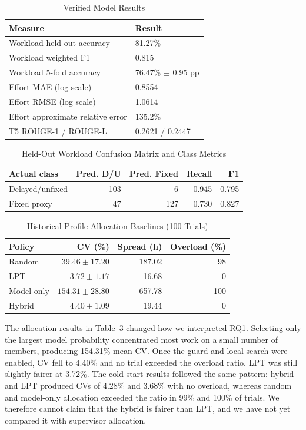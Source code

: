 \documentclass[conference]{IEEEtran}
\begin{document}
\begin{table}[t]
\caption{Verified Model Results}
\label{tab:results}
\centering
\footnotesize
\begin{tabular}{|p{3.65cm}|p{3.45cm}|}
\hline
Measure & Result \\ \hline
Workload held-out accuracy & 81.27\% \\ \hline
Workload weighted F1 & 0.815 \\ \hline
Workload 5-fold accuracy & 76.47\% $\pm$ 0.95 pp \\ \hline
Effort MAE (log scale) & 0.8554 \\ \hline
Effort RMSE (log scale) & 1.0614 \\ \hline
Effort approximate relative error & 135.2\% \\ \hline
T5 ROUGE-1 / ROUGE-L & 0.2621 / 0.2447 \\ \hline
\end{tabular}
\end{table}

\begin{table}[t]
\caption{Held-Out Workload Confusion Matrix and Class Metrics}
\label{tab:confusion}
\centering
\footnotesize
\begin{tabular}{|l|r|r|r|r|}
\hline
Actual class & Pred. D/U & Pred. Fixed & Recall & F1 \\ \hline
Delayed/unfixed & 103 & 6 & 0.945 & 0.795 \\ \hline
Fixed proxy & 47 & 127 & 0.730 & 0.827 \\ \hline
\end{tabular}
\end{table}

\begin{table}[t]
\caption{Historical-Profile Allocation Baselines (100 Trials)}
\label{tab:allocation}
\centering
\footnotesize
\begin{tabular}{|l|r|r|r|}
\hline
Policy & CV (\%) & Spread (h) & Overload (\%) \\ \hline
Random & $39.46\pm17.20$ & 187.02 & 98 \\ \hline
LPT & $3.72\pm1.17$ & 16.68 & 0 \\ \hline
Model only & $154.31\pm28.80$ & 657.78 & 100 \\ \hline
Hybrid & $4.40\pm1.09$ & 19.44 & 0 \\ \hline
\end{tabular}
\end{table}

The allocation results in Table~\ref{tab:allocation} changed how we interpreted RQ1. Selecting only the largest model probability concentrated most work on a small number of members, producing 154.31\% mean CV. Once the guard and local search were enabled, CV fell to 4.40\% and no trial exceeded the overload ratio. LPT was still slightly fairer at 3.72\%. The cold-start results followed the same pattern: hybrid and LPT produced CVs of 4.28\% and 3.68\% with no overload, whereas random and model-only allocation exceeded the ratio in 99\% and 100\% of trials. We therefore cannot claim that the hybrid is fairer than LPT, and we have not yet compared it with supervisor allocation.
\end{document}
